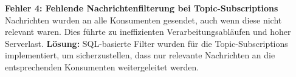 \item \textbf{Fehler 4: Fehlende Nachrichtenfilterung bei Topic-Subscriptions}  
Nachrichten wurden an alle Konsumenten gesendet, auch wenn diese nicht relevant waren. Dies führte zu ineffizienten Verarbeitungsabläufen und hoher Serverlast.  
\textbf{Lösung:} SQL-basierte Filter wurden für die Topic-Subscriptions implementiert, um sicherzustellen, dass nur relevante Nachrichten an die entsprechenden Konsumenten weitergeleitet werden.

